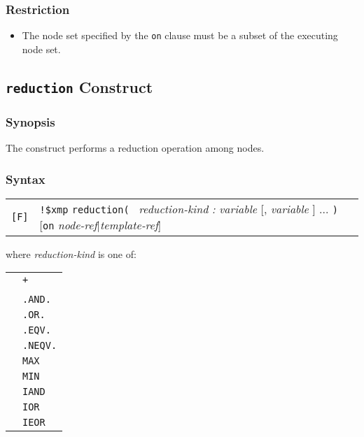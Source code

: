 \subsubsection*{Restriction}

\begin{itemize}
\item The node set specified by the {\tt on} clause must be a subset of the
      executing node set.  
\end{itemize}


\subsection{{\tt reduction} Construct}

\subsubsection*{Synopsis}

The {\tt {}} construct performs a reduction
operation among nodes. 

\subsubsection*{Syntax}

\begin{tabular}{ll}
\verb![F]! & \verb|!$xmp| {\tt reduction( } {\it reduction-kind} {\it
  :} {\it variable} [, {\it variable} ] ... {\tt )} [{\tt on} {\it
      node-ref}$\vert${\it template-ref}] \\
\end{tabular}

where {\it reduction-kind} is one of:

\begin{tabular}{ll}
 \hspace{0.5cm} & {\tt +} \\
 & {\tt *} \\
 & {\tt .AND.} \\
 & {\tt .OR.} \\
 & {\tt .EQV.} \\
 & {\tt .NEQV.} \\
 & {\tt MAX} \\
 & {\tt MIN} \\
 & {\tt IAND} \\
 & {\tt IOR} \\
 & {\tt IEOR} \\
\end{tabular}

